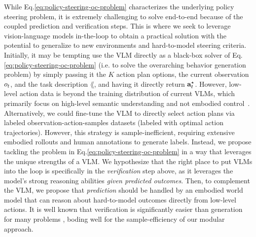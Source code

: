 While Eq.\ref{eq:policy-steering-oc-problem} characterizes the underlying policy steering problem, it is extremely challenging to solve end-to-end because of the coupled prediction and verification steps. 
This is where we seek to leverage vision-language models in-the-loop to obtain a practical solution with the potential to generalize to new environments and hard-to-model steering criteria.
Initially, it may be tempting use the VLM directly as a black-box solver of Eq.\ref{eq:policy-steering-oc-problem} (i.e. to solve the overarching behavior generation problem) by simply passing it the $K$ action plan options, the current observation $o_t$, and the task description $\lang$, and having it directly return $\mathbf{a}^{\star}_t$. 
However, low-level action data is beyond the training distribution of current VLMs, which primarily focus on high-level semantic understanding and not embodied control~\citep{hu2023toward}. 
Alternatively, we could fine-tune the VLM to directly select action plans via labeled observation-action-samples datasets (labeled with optimal action trajectories). 
However, this strategy is sample-inefficient, requiring extensive embodied rollouts and human annotations to generate labels. 
Instead, we propose tackling the problem in Eq.\ref{eq:policy-steering-oc-problem} in a way that leverages the unique strengths of a VLM. 
We hypothesize that the right place to put VLMs into the loop is specifically in the \textit{verification} step above, as it leverages the model’s strong reasoning abilities \textit{given predicted outcomes}.
Then, to complement the VLM, we propose that \textit{prediction} should be handled by an embodied world model that can reason about hard-to-model outcomes directly from low-level actions.
It is well known that verification is significantly easier than generation for many problems \citep{cook2023complexity}, boding well for the sample-efficiency of our modular approach. 










    









